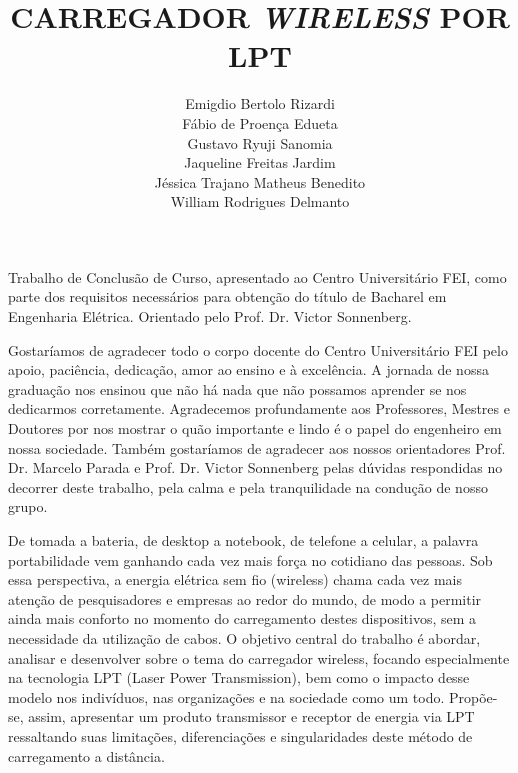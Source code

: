 \documentclass[numeric]{fei}
\title{CARREGADOR \emph{WIRELESS} POR LPT}
\author{
	Emigdio Bertolo Rizardi\\
	Fábio de Proença Edueta\\
	Gustavo Ryuji Sanomia\\
	Jaqueline Freitas Jardim\\
	Jéssica Trajano Matheus Benedito\\
	William Rodrigues Delmanto
}
\begin{document}
\maketitle

\begin{folhaderosto}
Trabalho de Conclusão de Curso, apresentado ao Centro Universitário FEI, como parte dos requisitos necessários para obtenção do título de Bacharel em Engenharia Elétrica. Orientado pelo Prof. Dr. Victor Sonnenberg.
\end{folhaderosto}

\fichacatalografica
\folhadeaprovacao


\begin{agradecimentos}
Gostaríamos de agradecer todo o corpo docente do Centro Universitário FEI pelo apoio, paciência, dedicação, amor ao ensino e à excelência. A jornada de nossa graduação nos ensinou que não há nada que não possamos aprender se nos dedicarmos corretamente. Agradecemos profundamente aos Professores, Mestres e Doutores por nos mostrar o quão importante e lindo é o papel do engenheiro em nossa sociedade.
Também gostaríamos de agradecer aos nossos orientadores Prof. Dr. Marcelo Parada e Prof. Dr. Victor Sonnenberg pelas dúvidas respondidas no decorrer deste trabalho, pela calma e pela tranquilidade na condução de nosso grupo.
\end{agradecimentos}

\begin{resumo}
De tomada a bateria, de desktop a notebook, de telefone a celular, a palavra portabilidade vem ganhando cada vez mais força no cotidiano das pessoas. Sob essa perspectiva, a energia elétrica sem fio (wireless) chama cada vez mais atenção de pesquisadores e empresas ao redor do mundo, de modo a permitir ainda mais conforto no momento do carregamento destes dispositivos, sem a necessidade da utilização de cabos. O objetivo central do trabalho é abordar, analisar e desenvolver sobre o tema do carregador wireless, focando especialmente na tecnologia LPT (Laser Power Transmission), bem como o impacto desse modelo nos indivíduos, nas organizações e na sociedade como um todo. Propõe-se, assim, apresentar um produto transmissor e receptor de energia via LPT ressaltando suas limitações, diferenciações e singularidades deste método de carregamento a distância.
\end{resumo}
\end{document}
